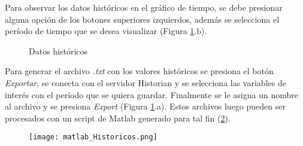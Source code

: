 Para observar los datos históricos en el gráfico de tiempo, se debe presionar alguna opción de los botones superiores izquierdos, además se selecciona el período de tiempo que se desea visualizar (Figura \ref{fig:scada3a3}.b).


\begin{figure}[h!]
	\centering
	\caption{Datos históricos} \label{fig:scada3a3}
\end{figure}

Para generar el archivo \textit{.txt} con los valores históricos se presiona el botón \textit{Exportar}, se conecta con el servidor Historian y se selecciona las variables de interés con el período que se quiera guardar.
Finalmente se le asigna un nombre al archivo y se presiona \textit{Export} (Figura \ref{fig:scada3a3}.a).
Estos archivos luego pueden ser procesados con un script de Matlab generado para tal fin (\ref{fig:matlabH}).


\begin{figure}[h!]
	\centering
	\texttt{[image: matlab\_Historicos.png]}
	\label{fig:matlabH}
\end{figure}

\clearpage
\newpage

